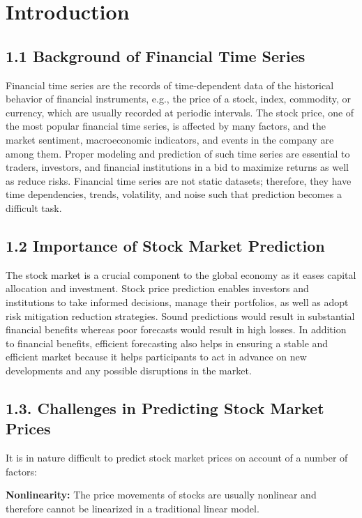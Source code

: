 \documentclass[12pt,a4paper]{report}
\begin{document}
\mainmatter

\chapter{Introduction}
\label{ch:1}
\section{1.1 Background of Financial Time Series}
Financial time series are the records of time-dependent data of the historical behavior of financial instruments, e.g., the price of a stock, index, commodity, or currency, which are usually recorded at periodic intervals. The stock price, one of the most popular financial time series, is affected by many factors, and the market sentiment, macroeconomic indicators, and events in the company are among them. Proper modeling and prediction of such time series are essential to traders, investors, and financial institutions in a bid to maximize returns as well as reduce risks. Financial time series are not static datasets; therefore, they have time dependencies, trends, volatility, and noise such that prediction becomes a difficult task.

\section{1.2 Importance of Stock Market Prediction}
The stock market is a crucial component to the global economy as it eases capital allocation and investment. Stock price prediction enables investors and institutions to take informed decisions, manage their portfolios, as well as adopt risk mitigation reduction strategies. Sound predictions would result in substantial financial benefits whereas poor forecasts would result in high losses. In addition to financial benefits, efficient forecasting also helps in ensuring a stable and efficient market because it helps participants to act in advance on new developments and any possible disruptions in the market.

\section{1.3. Challenges in Predicting Stock Market Prices}
It is in nature difficult to predict stock market prices on account of a number of factors: 

\textbf{Nonlinearity:} The price movements of stocks are usually nonlinear and therefore cannot be linearized in a traditional linear model. 
\end{document}

